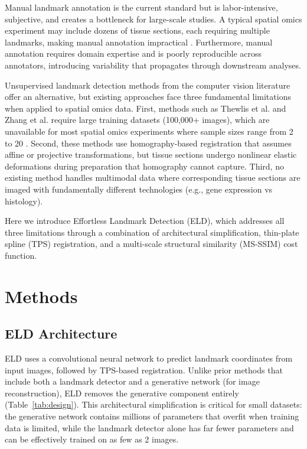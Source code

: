 \documentclass[11pt]{article}
\begin{document}
Manual landmark annotation is the current standard but is labor-intensive, subjective, and creates a bottleneck for large-scale studies. A typical spatial omics experiment may include dozens of tissue sections, each requiring multiple landmarks, making manual annotation impractical \citep{lein2007}. Furthermore, manual annotation requires domain expertise and is poorly reproducible across annotators, introducing variability that propagates through downstream analyses.

Unsupervised landmark detection methods from the computer vision literature offer an alternative, but existing approaches face three fundamental limitations when applied to spatial omics data. First, methods such as Thewlis et al. and Zhang et al. require large training datasets (100,000+ images), which are unavailable for most spatial omics experiments where sample sizes range from 2 to 20 \citep{thewlis2017,zhang2018}. Second, these methods use homography-based registration that assumes affine or projective transformations, but tissue sections undergo nonlinear elastic deformations during preparation that homography cannot capture. Third, no existing method handles multimodal data where corresponding tissue sections are imaged with fundamentally different technologies (e.g., gene expression vs histology).

Here we introduce Effortless Landmark Detection (ELD), which addresses all three limitations through a combination of architectural simplification, thin-plate spline (TPS) registration, and a multi-scale structural similarity (MS-SSIM) cost function.

\section{Methods}

\subsection{ELD Architecture}

ELD uses a convolutional neural network to predict landmark coordinates from input images, followed by TPS-based registration. Unlike prior methods that include both a landmark detector and a generative network (for image reconstruction), ELD removes the generative component entirely (Table~\ref{tab:design}). This architectural simplification is critical for small datasets: the generative network contains millions of parameters that overfit when training data is limited, while the landmark detector alone has far fewer parameters and can be effectively trained on as few as 2 images.
\end{document}
